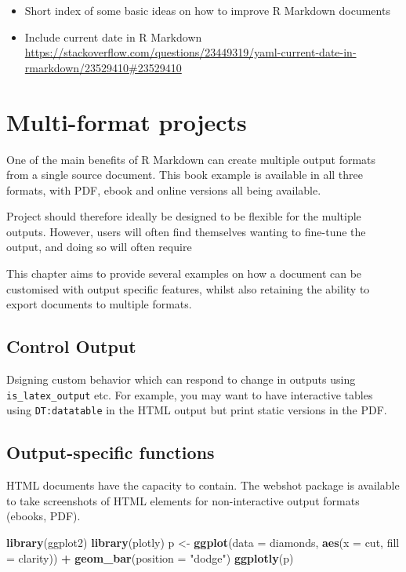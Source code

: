 \documentclass[]{book}
\newenvironment{Shaded}{\begin{snugshade}}{\end{snugshade}}
\newcommand{\KeywordTok}[1]{\textcolor[rgb]{0.13,0.29,0.53}{\textbf{#1}}}
\newcommand{\DataTypeTok}[1]{\textcolor[rgb]{0.13,0.29,0.53}{#1}}
\newcommand{\StringTok}[1]{\textcolor[rgb]{0.31,0.60,0.02}{#1}}
\newcommand{\OperatorTok}[1]{\textcolor[rgb]{0.81,0.36,0.00}{\textbf{#1}}}
\newcommand{\NormalTok}[1]{#1}
\begin{document}
\begin{itemize}
\item
  Short index of some basic ideas on how to improve R Markdown documents
\item
  Include current date in R Markdown
  \url{https://stackoverflow.com/questions/23449319/yaml-current-date-in-rmarkdown/23529410\#23529410}
\end{itemize}

\chapter{Multi-format projects}\label{multi-format-projects}

One of the main benefits of R Markdown can create multiple output
formats from a single source document. This book example is available in
all three formats, with PDF, ebook and online versions all being
available.

Project should therefore ideally be designed to be flexible for the
multiple outputs. However, users will often find themselves wanting to
fine-tune the output, and doing so will often require

This chapter aims to provide several examples on how a document can be
customised with output specific features, whilst also retaining the
ability to export documents to multiple formats.

\section{Control Output}\label{control-output}

Dsigning custom behavior which can respond to change in outputs using
\texttt{is\_latex\_output} etc. For example, you may want to have
interactive tables using \texttt{DT:datatable} in the HTML output but
print static versions in the PDF.

\section{Output-specific functions}\label{output-specific-functions}

HTML documents have the capacity to contain. The webshot package is
available to take screenshots of HTML elements for non-interactive
output formats (ebooks, PDF).

\begin{Shaded}
\begin{Highlighting}[]
\KeywordTok{library}\NormalTok{(ggplot2)}
\KeywordTok{library}\NormalTok{(plotly)}
\NormalTok{p <-}\StringTok{ }\KeywordTok{ggplot}\NormalTok{(}\DataTypeTok{data =}\NormalTok{ diamonds, }\KeywordTok{aes}\NormalTok{(}\DataTypeTok{x =}\NormalTok{ cut, }\DataTypeTok{fill =}\NormalTok{ clarity)) }\OperatorTok{+}
\StringTok{            }\KeywordTok{geom_bar}\NormalTok{(}\DataTypeTok{position =} \StringTok{"dodge"}\NormalTok{)}
\KeywordTok{ggplotly}\NormalTok{(p)}
\end{Highlighting}
\end{Shaded}
\end{document}
